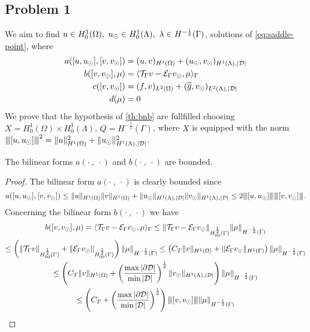 \subsection{Problem 1}
We aim to find $u \in H^1_0(\Omega),\ u_{\odot} \in H_0^1(\Lambda), \ \lambda \in H^{-\frac12}(\Gamma )$,
solutions of \eqref{eq:saddle-point}, where
\begin{align*}
a([u, u_{\odot}], [v, v_{\odot}])&= (u,v)_{H^1(\Omega)} + (u_{\odot},v_{\odot})_{H^1(\Lambda),|\mathcal{D}|}
\\
b([v, v_{\odot}], \mu)&= \langle {\mathcal{T}_\Gamma} v - \mathcal{E}_\Gamma v_{\odot} , \mu \rangle_\Gamma
\\
c([v,v_{\odot}])&= (f,v)_{L^2(\Omega)} + (\overline{\overline{g}},v_{\odot})_{L^2(\Lambda),|\mathcal{D}|}
\\
d(\mu)&=0
\end{align*}
We prove that the hypothesis of \ref{th:bnb} are fullfilled choosing 
$X=H^1_0(\Omega) \times H^1_0(\Lambda)$, $Q=H^{-\frac 12}(\Gamma)$, where $X$  is equipped with the norm ${\left\vert\kern-0.25ex\left\vert\kern-0.25ex\left\vert [u,u_{\odot} ] \right\vert\kern-0.25ex\right\vert\kern-0.25ex\right\vert}^2=\|u\|^2_{H^1(\Omega)} + \|u_{\odot}\|^2_{H^1(\Lambda),|\mathcal{D}|}$.
\begin{lemma}\label{lemma:prob1_boundedness} 
The bilinear forms $a(\cdot \ , \ \cdot)$ and $b(\cdot \ , \ \cdot)$ are bounded.
\end{lemma}
\begin{proof}
The bilinear form $a(\cdot \ , \ \cdot)$ is clearly bounded since
\begin{equation*}
a([u, u_{\odot}], [v, v_{\odot}])\leq \|u\|_{H^1(\Omega)}\|v\|_{H^1(\Omega)} + \|u_{\odot}\|_{H^1(\Lambda), |\mathcal{D}|}\|v_{\odot}\|_{H^1(\Lambda), |\mathcal{D}|} \leq 2 {\left\vert\kern-0.25ex\left\vert\kern-0.25ex\left\vert [u, u_{\odot}] \right\vert\kern-0.25ex\right\vert\kern-0.25ex\right\vert}{\left\vert\kern-0.25ex\left\vert\kern-0.25ex\left\vert [v, v_{\odot}] \right\vert\kern-0.25ex\right\vert\kern-0.25ex\right\vert}.
\end{equation*}
Concerning the bilinear form $b(\cdot \ , \ \cdot)$ we have
\begin{multline*}
b([v, v_{\odot}], \mu)= \langle {\mathcal{T}_\Gamma} v - \mathcal{E}_\Gamma v_{\odot} , \mu \rangle_\Gamma 
\leq \|{\mathcal{T}_\Gamma} v - \mathcal{E}_\Gamma v_{\odot}\|_{H^{\frac 12}_{00}(\Gamma)}\|\mu\|_{H^{-\frac 12}(\Gamma)}\\
\leq \left(\|{\mathcal{T}_\Gamma} v\|_{H^{\frac 12}_{00}(\Gamma)} + \|\mathcal{E}_\Gamma v_{\odot}\|_{H^{\frac 12}_{00}(\Gamma)}\right)\|\mu\|_{H^{-\frac 12}(\Gamma)}
\leq \left(C_T \|v\|_{H^1(\Omega)} + \|\mathcal{E}_\Gamma v_{\odot}\|_{H^1(\Gamma)}\right)\|\mu\|_{H^{-\frac 12}(\Gamma)}\\
\leq \left(C_T \|v\|_{H^1(\Omega)} + \left(\frac{\max |\partial\mathcal{D}|}{\min |\mathcal{D}|}\right)^{\frac 12} \|v_{\odot}\|_{H^1(\Lambda),|\mathcal{D}|}\right)\|\mu\|_{H^{-\frac 12}(\Gamma)}\\
\leq \left( C_T + \left(\frac{\max |\partial\mathcal{D}|}{\min |\mathcal{D}|}\right)^{\frac 12}\right) {\left\vert\kern-0.25ex\left\vert\kern-0.25ex\left\vert [v,v_{\odot}] \right\vert\kern-0.25ex\right\vert\kern-0.25ex\right\vert}\|\mu\|_{H^{-\frac 12}(\Gamma)}
\end{multline*}
\end{proof}

